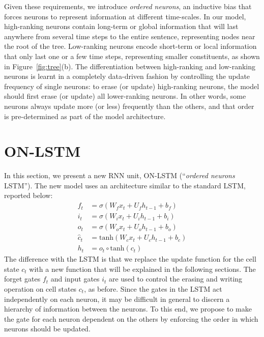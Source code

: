 \documentclass{article} \usepackage{iclr2019_conference,times}
\begin{document}
Given these requirements, we introduce \emph{ordered neurons}, an inductive bias that forces neurons to represent information at different time-scales. In our model, high-ranking neurons contain long-term or global information that will last anywhere from several time steps to the entire sentence, representing nodes near the root of the tree. Low-ranking neurons encode short-term or local information that only last one or a few time steps, representing smaller constituents, as shown in Figure~\ref{fig:tree}(b). The differentiation between high-ranking and low-ranking neurons is learnt in a completely data-driven fashion by controlling the update frequency of single neurons: to erase (or update) high-ranking neurons, the model should first erase (or update) all lower-ranking neurons. In other words, some neurons always update more (or less) frequently than the others, and that order is pre-determined as part of the model architecture.
























%
 
\section{ON-LSTM}
In this section, we present a new RNN unit, ON-LSTM (``\emph{ordered neurons} LSTM'').
The new model uses an architecture similar to the standard LSTM, reported below:
\begin{align}
    f_{t}&=\sigma (W_{f}x_{t}+U_{f}h_{t-1}+b_{f}) \label{eq:forgetgate} \\
    i_{t}&=\sigma (W_{i}x_{t}+U_{i}h_{t-1}+b_{i}) \label{eq:inputgate} \\
    o_{t}&=\sigma (W_{o}x_{t}+U_{o}h_{t-1}+b_{o}) \label{eq:outputgate} \\
    \hat{c}_{t} &= \mathrm{tanh} (W_{c}x_{t}+U_{c}h_{t-1}+b_{c}) \label{eq:cellgate} \\
h_{t}&=o_{t}\circ \mathrm{tanh} (c_{t}) \label{eq:lstmoutput}
\end{align}
The difference with the LSTM is that we replace the update function for the cell state $c_t$ with a new function that will be explained in the following sections.
The forget gates $f_t$ and input gates $i_t$ are used to control the erasing and writing operation on cell states $c_t$, as before.
Since the gates in the LSTM act independently on each neuron, it may be difficult in general to discern a hierarchy of information between the neurons. To this end, we propose to make the gate for each neuron dependent on the others by enforcing the order in which neurons should be updated.
\end{document}
